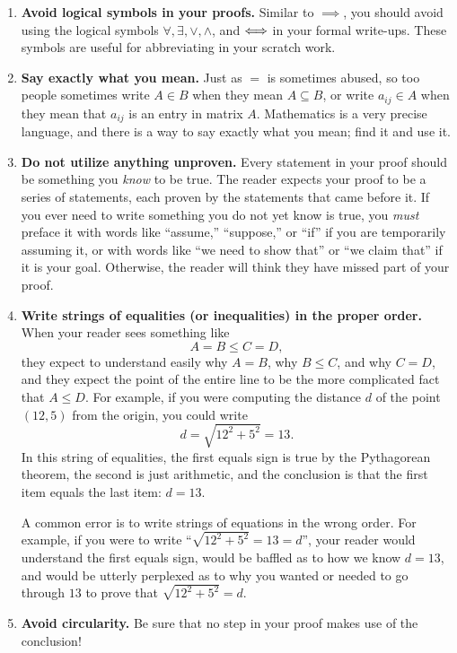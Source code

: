 \begin{enumerate}
\item \textbf{Avoid logical symbols in your proofs.}  
Similar to $\implies$, you should avoid using the logical symbols $\forall, \exists, \vee, \wedge$, and $\Longleftrightarrow$ in your formal write-ups.  These symbols are useful for abbreviating in your scratch work. 

\item \textbf{Say exactly what you mean.}
Just as $=$ is sometimes abused, so too people sometimes write $A\in B$ when they mean $A\subseteq B$, or write $a_{ij}\in A$ when they mean that $a_{ij}$ is an entry in matrix $A$. Mathematics is a very precise language, and there is a way to say exactly what you mean; find it and use it.

\item \textbf{Do not utilize anything unproven.}
Every statement in your proof should be something you \emph{know} to be true. The reader expects your proof to be a series of statements, each proven by the statements that came before it. If you ever need to write something you do not yet know is true, you \emph{must} preface it with words like ``assume,'' ``suppose,'' or ``if'' if you are temporarily assuming it, or with words like ``we need to show that'' or ``we claim that'' if it is your goal. Otherwise, the reader will think they have missed part of your proof.

\item \textbf{Write strings of equalities (or inequalities) in the proper order.}
When your reader sees something like
\[
A=B\leq C=D,
\]
they expect to understand easily why $A=B$, why $B\leq C$, and why $C=D$, and they expect the point of the entire line to be the more complicated fact that $A\leq D$. For example, if you were computing the distance $d$ of the point $(12,5)$ from the origin, you could write
\[
d = \sqrt{12^2+5^2} = 13.
\]
In this string of equalities, the first equals sign is true by the Pythagorean theorem, the second is just arithmetic, and the conclusion is that the first item equals the last item: $d=13$.
        
A common error is to write strings of equations in the wrong order. For example, if you were to write ``$\sqrt{12^2+5^2}=13=d$'', your reader would understand the first equals sign, would be baffled as to how we know $d=13$, and would be utterly perplexed as to why you wanted or needed to go through $13$ to prove that $\sqrt{12^2+5^2}=d$.

\item \textbf{Avoid circularity.}  Be sure that no step in your proof makes use of the conclusion!
        

\end{enumerate}
